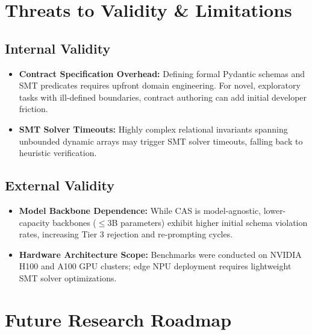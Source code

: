 \documentclass[10pt,twocolumn,letterpaper]{article}
\begin{document}
\section{Threats to Validity \& Limitations}



\subsection{Internal Validity}

\begin{itemize}
  \item \textbf{Contract Specification Overhead:} Defining formal Pydantic schemas and SMT predicates requires upfront domain engineering. For novel, exploratory tasks with ill-defined boundaries, contract authoring can add initial developer friction.
  \item \textbf{SMT Solver Timeouts:} Highly complex relational invariants spanning unbounded dynamic arrays may trigger SMT solver timeouts, falling back to heuristic verification.
\end{itemize}


\subsection{External Validity}

\begin{itemize}
  \item \textbf{Model Backbone Dependence:} While CAS is model-agnostic, lower-capacity backbones ($\le 3$B parameters) exhibit higher initial schema violation rates, increasing Tier 3 rejection and re-prompting cycles.
  \item \textbf{Hardware Architecture Scope:} Benchmarks were conducted on NVIDIA H100 and A100 GPU clusters; edge NPU deployment requires lightweight SMT solver optimizations.
\end{itemize}




\section{Future Research Roadmap}
\end{document}
